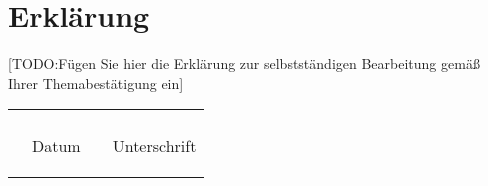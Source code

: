\chapter*{Erklärung}

[TODO:\@ Fügen Sie hier die Erklärung zur selbstständigen Bearbeitung gemäß Ihrer Themabestätigung ein]

\vspace{2cm}
\begin{tabular}{@{}p{0cm}p{6cm}p{}p{6cm}@{}}
& \hrulefill& & \hrulefill\\
& \begin{flushleft}Datum\end{flushleft} & & \begin{flushleft}Unterschrift\end{flushleft}\\
\end{tabular}
